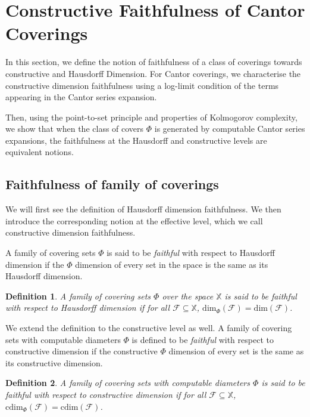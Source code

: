 \documentclass[11pt]{article}
\newtheorem{definition}{Definition}
\newcommand{\cdim}{\mathrm{cdim}}
\renewcommand{\dim}{{\mathrm{dim}}}
\newcommand{\F}{{\mathcal{F}}}
\newcommand{\X}{{\mathbb{X}}}
\renewcommand{\F}{\mathcal{F}}
\begin{document}
\section{Constructive Faithfulness of Cantor Coverings} \label{sec:CantorFaith}

In this section, we define the notion of faithfulness of a class of coverings towards constructive and Hausdorff Dimension. For Cantor coverings, we characterise the constructive dimension faithfulness using a log-limit condition of the terms appearing in the Cantor series expansion. 

Then, using the point-to-set principle and properties of
Kolmogorov complexity, we show that when the class of covers $\Phi$ is
generated by computable Cantor series expansions, the faithfulness at
the Hausdorff and constructive levels are equivalent notions.

\subsection{Faithfulness of family of coverings}
We will first see the definition of Hausdorff dimension faithfulness.
We then introduce the corresponding notion at the effective level,
which we call constructive dimension faithfulness.

A family of covering sets $\Phi$ is said to be \emph{faithful} with respect
to Hausdorff dimension if the $\Phi$ dimension of every set in the
space is the same as its Hausdorff dimension.

\begin{definition}
	A family of covering sets $\Phi$ over the space $\X$ is said to be \emph{faithful with respect to Hausdorff dimension} if for all
	$\F \subseteq \X$, $\dim_\Phi(\F) = \dim(\F)$.
\end{definition}


We extend the definition to the constructive level as well. A family of  covering sets with computable diameters $\Phi$ is defined to be \emph{faithful}
with respect to constructive dimension if the constructive $\Phi$
dimension of every set is the same as its constructive dimension.

\begin{definition}
	A family of  covering sets with computable diameters $\Phi$ is
	said to be \emph{faithful with respect to constructive
		dimension} if for all $\F \subseteq \X$, $\cdim_\Phi(\F) =
	\cdim(\F)$.
\end{definition}
\end{document}
